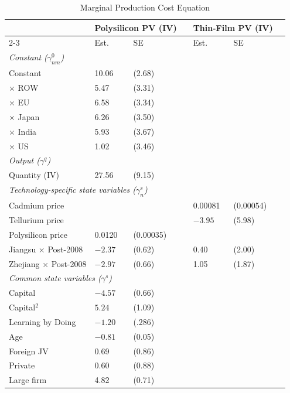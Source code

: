 \documentclass[12pt]{article}
\begin{document}
\begin{table}[!h]
\centering
\caption{Marginal Production Cost Equation}
\label{tab:iv_est_marginal_cost_rescaled}
\begin{threeparttable}
\begin{tabularx}{0.92\textwidth}{Xllllll}
\toprule
 & \multicolumn{2}{c}{Polysilicon PV (IV)} && \multicolumn{2}{c}{Thin-Film PV (IV)} \\
\cmidrule{2-3} \cmidrule{5-6}
 & Est. & SE && Est. & SE \\
\midrule
\multicolumn{5}{l}{\textit{Constant ($\gamma^0_{nm}$)}}\\
\quad Constant & 10.06\sym{***} & (2.68) && & \\
\quad $\times$ ROW  & 5.47\sym{*} & (3.31) && & \\
\quad $\times$ EU   & 6.58\sym{**} & (3.34) && & \\
\quad $\times$ Japan & 6.26\sym{*} & (3.50) && & \\
\quad $\times$ India & 5.93 & (3.67) && & \\
\quad $\times$ US    & 1.02 & (3.46) && & \\[0.4em]

\multicolumn{5}{l}{\textit{Output ($\gamma^q$)}}\\
\quad Quantity (IV) & 27.56\sym{***} & (9.15) && & \\[0.6em]

\multicolumn{5}{l}{\textit{Technology-specific state variables ($\gamma^s_n$)}}\\
\quad Cadmium price && && 0.00081 & (0.00054) \\
\quad Tellurium price && && $-3.95$ & (5.98) \\
\quad Polysilicon price & 0.0120\sym{***} & (0.00035) && & \\
\quad Jiangsu × Post-2008 & $-2.37$\sym{***} & (0.62) && 0.40 & (2.00) \\
\quad Zhejiang × Post-2008 & $-2.97$\sym{***} & (0.66) && 1.05 & (1.87) \\

\multicolumn{5}{l}{\textit{Common state variables ($\gamma^s$)}}\\
\quad Capital & $-4.57$\sym{***} & (0.66) && & \\
\quad Capital$^2$ & $5.24$\sym{***} & (1.09) && & \\
\quad Learning by Doing & $-1.20$\sym{***} & (.286) && & \\[0.4em]
\quad Age & $-0.81$\sym{***} & (0.05) && & \\
\quad Foreign JV & 0.69 & (0.86) && & \\
\quad Private & 0.60 & (0.88) && & \\
\quad Large firm & 4.82\sym{***} & (0.71) && & \\


\end{tabularx}
\end{threeparttable}
\end{table}
\end{document}

